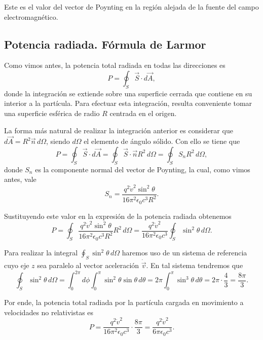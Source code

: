\documentclass[12pt,a4paper]{book}
\begin{document}
Este es el valor del vector de Poynting en la región alejada de la fuente del campo electromagnético.

\subsection{Potencia radiada. Fórmula de Larmor}

Como vimos antes, la potencia total radiada en todas las direcciones es
\begin{equation}
P = \oint_S \vec{S} \cdot d\vec{A},
\end{equation}
donde la integración se extiende sobre una superficie cerrada que contiene en su interior a la partícula. Para efectuar esta integración, resulta conveniente tomar una superficie esférica de radio $R$ centrada en el origen.

La forma más natural de realizar la integración anterior es considerar que $d\vec{A} = R^2\vec{n}\,d\Omega$, siendo $d\Omega$ el elemento de ángulo sólido. Con ello se tiene que
\begin{equation}
P = \oint_S \vec{S} \cdot d\vec{A} = \oint_S \vec{S} \cdot \vec{n}R^2\,d\Omega = \oint_S S_nR^2\,d\Omega,
\end{equation}
donde $S_n$ es la componente normal del vector de Poynting, la cual, como vimos antes, vale
\begin{equation}
S_n = \frac{q^2\dot{v}^2\sin^2\theta}{16\pi^2\epsilon_0c^3R^2}.
\end{equation}

Sustituyendo este valor en la expresión de la potencia radiada obtenemos
\begin{equation}
P = \oint_S \frac{q^2\dot{v}^2\sin^2\theta}{16\pi^2\epsilon_0c^3R^2}R^2\,d\Omega = \frac{q^2\dot{v}^2}{16\pi^2\epsilon_0c^3}\oint_S \sin^2\theta\,d\Omega.
\end{equation}

Para realizar la integral $\oint_S \sin^2\theta\,d\Omega$ haremos uso de un sistema de referencia cuyo eje $z$ sea paralelo al vector aceleración $\dot{\vec{v}}$. En tal sistema tendremos que
\begin{equation}
\oint_S \sin^2\theta\,d\Omega = \int_0^{2\pi}d\phi\int_0^{\pi}\sin^2\theta\sin\theta\,d\theta = 2\pi\int_0^{\pi}\sin^3\theta\,d\theta = 2\pi\cdot\frac{4}{3} = \frac{8\pi}{3}.
\end{equation}

Por ende, la potencia total radiada por la partícula cargada en movimiento a velocidades no relativistas es
\begin{equation}
P = \frac{q^2\dot{v}^2}{16\pi^2\epsilon_0c^3}\cdot\frac{8\pi}{3} = \frac{q^2\dot{v}^2}{6\pi\epsilon_0c^3}.
\end{equation}
\end{document}
